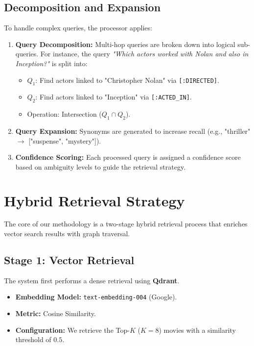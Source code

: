 \documentclass[a4paper, 12pt]{extreport}
\begin{document}
\subsection{Decomposition and Expansion}
To handle complex queries, the processor applies:
\begin{enumerate}
    \item \textbf{Query Decomposition:} Multi-hop queries are broken down into logical sub-queries. For instance, the query \textit{"Which actors worked with Nolan and also in Inception?"} is split into:
    \begin{itemize}
        \item $Q_1$: Find actors linked to "Christopher Nolan" via \texttt{[:DIRECTED]}.
        \item $Q_2$: Find actors linked to "Inception" via \texttt{[:ACTED\_IN]}.
        \item Operation: Intersection ($Q_1 \cap Q_2$).
    \end{itemize}
    \item \textbf{Query Expansion:} Synonyms are generated to increase recall (e.g., "thriller" $\rightarrow$ ["suspense", "mystery"]).
    \item \textbf{Confidence Scoring:} Each processed query is assigned a confidence score based on ambiguity levels to guide the retrieval strategy.
\end{enumerate}

\section{Hybrid Retrieval Strategy}
\label{sec:retrieval_strategy}

The core of our methodology is a two-stage hybrid retrieval process that enriches vector search results with graph traversal.

\subsection{Stage 1: Vector Retrieval}
The system first performs a dense retrieval using \textbf{Qdrant}.
\begin{itemize}
    \item \textbf{Embedding Model:} \texttt{text-embedding-004} (Google).
    \item \textbf{Metric:} Cosine Similarity.
    \item \textbf{Configuration:} We retrieve the Top-$K$ ($K=8$) movies with a similarity threshold of $0.5$.
\end{itemize}
\end{document}
